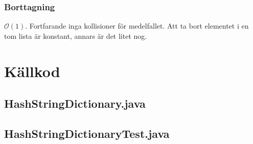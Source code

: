 \documentclass[a4paper,10pt,twoside]{article}
\newcommand{\Ordo}[1]{$\mathcal{O}(#1)$}
\begin{document}
		\subsubsection*{Borttagning}

		\Ordo{1}. Fortfarande inga kollisioner för medelfallet. Att ta bort elementet i en tom lista är konstant, annars är det litet nog.


\newpage
\section{Källkod}
	\subsection*{HashStringDictionary.java}
	\subsection*{HashStringDictionaryTest.java}
\end{document}
